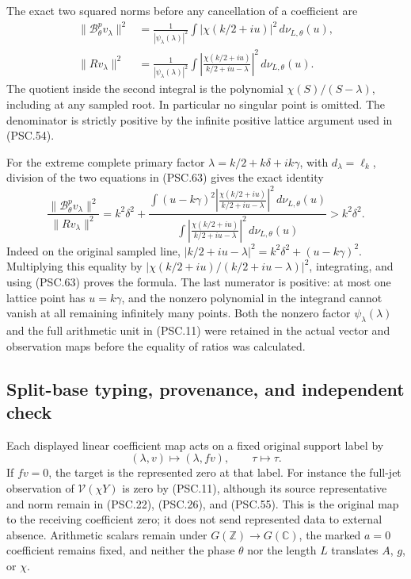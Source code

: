 The exact two squared norms before any cancellation of a coefficient are
\[
 \begin{aligned}
 \|\mathscr B^p_\theta v_\lambda\|^2
 &=\frac1{|\psi_\lambda(\lambda)|^2}
       \int|\chi(k/2+iu)|^2\,d\nu_{L,\theta}(u),\\
 \|R v_\lambda\|^2
 &=\frac1{|\psi_\lambda(\lambda)|^2}
       \int\left|
       \frac{\chi(k/2+iu)}{k/2+iu-\lambda}
       \right|^2\,d\nu_{L,\theta}(u).
 \end{aligned}
 \tag{PSC.63}
\]
The quotient inside the second integral is the polynomial
\(\chi(S)/(S-\lambda)\), including at any sampled root. In particular no singular point is omitted. The denominator is strictly positive by the infinite positive lattice argument used in (PSC.54).

For the extreme complete primary factor
\(\lambda=k/2+k\delta+ik\gamma\), with \(d_\lambda=\ell_k\), division of the two equations in (PSC.63) gives the exact identity
\[
 \boxed{
 \frac{\|\mathscr B^p_\theta v_\lambda\|^2}
      {\|R v_\lambda\|^2}
 =k^2\delta^2+
 \frac{\displaystyle\int (u-k\gamma)^2
       \left|\frac{\chi(k/2+iu)}{k/2+iu-\lambda}\right|^2
           \,d\nu_{L,\theta}(u)}
      {\displaystyle\int
       \left|\frac{\chi(k/2+iu)}{k/2+iu-\lambda}\right|^2
           \,d\nu_{L,\theta}(u)}
 >k^2\delta^2.}
 \tag{PSC.64}
\]
Indeed on the original sampled line,
\(|k/2+iu-\lambda|^2=k^2\delta^2+(u-k\gamma)^2\).
Multiplying this equality by
\(|\chi(k/2+iu)/(k/2+iu-\lambda)|^2\), integrating, and using (PSC.63) proves the formula. The last numerator is positive: at most one lattice point has \(u=k\gamma\), and the nonzero polynomial in the integrand cannot vanish at all remaining infinitely many points. Both the nonzero factor \(\psi_\lambda(\lambda)\) and the full arithmetic unit in (PSC.11) were retained in the actual vector and observation maps before the equality of ratios was calculated.

\subsection{Split-base typing, provenance, and independent check}

Each displayed linear coefficient map acts on a fixed original support label by
\[
 (\lambda,v)\longmapsto(\lambda,fv),\qquad
 \tau\longmapsto\tau .
 \]
If \(fv=0\), the target is the represented zero at that label. For instance the full-jet observation of \(\mathcal V(\chi Y)\) is zero by (PSC.11), although its source representative and norm remain in (PSC.22), (PSC.26), and (PSC.55). This is the original map to the receiving coefficient zero; it does not send represented data to external absence. Arithmetic scalars remain under
\(G(\mathbb Z)\to G(\mathbb C)\), the marked \(a=0\) coefficient remains fixed, and neither the phase \(\theta\) nor the length \(L\) translates \(A\), \(g\), or \(\chi\).

